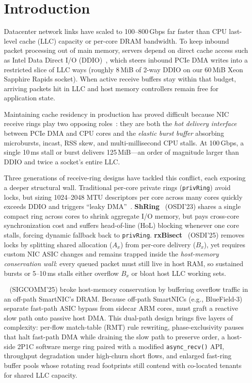 \section{Introduction}
\label{sec:intro}

Datacenter network links have scaled to 100--800\,Gbps far faster than CPU
last-level cache (LLC) capacity or per-core DRAM bandwidth. To keep inbound
packet processing out of main memory, servers depend on direct cache access
such as Intel Data Direct I/O (DDIO)~\cite{huggahalli2005dca,intelddio,farshin2020ddio},
which steers inbound PCIe DMA writes into a restricted slice of LLC ways
(roughly 8\,MiB of 2-way DDIO on our 60\,MiB Xeon Sapphire Rapids socket). When
active receive buffers stay within that budget, arriving packets hit in LLC and
host memory controllers remain free for application state.

Maintaining cache residency in production has proved difficult because NIC
receive rings play two opposing roles~\cite{pismenny2025rxbisect,liu2025ceio}:
they are both the \emph{hot delivery interface} between PCIe DMA and CPU cores
and the \emph{elastic burst buffer} absorbing microbursts, incast, RSS skew,
and multi-millisecond CPU stalls. At 100\,Gbps, a single 10\,ms stall or burst
delivers 125\,MiB---an order of magnitude larger than DDIO and twice a socket's
entire LLC.

Three generations of receive-ring designs have tackled this conflict, each
exposing a deeper structural wall. Traditional per-core private rings
(\texttt{privRing}) avoid locks, but sizing 1024--2048 MTU descriptors per core
across many cores quickly exceeds DDIO and triggers ``leaky
DMA''~\cite{tootoonchian2018resq,farshin2020ddio,yuan2021ioalloc}.
\textbf{ShRing}~\cite{pismenny2023shring} (OSDI'23) shares a single compact
ring across cores to shrink aggregate I/O memory, but pays cross-core
synchronization cost and suffers head-of-line (HoL) blocking whenever one core
stalls, forcing dynamic fallback back to \texttt{privRing}.
\textbf{rxBisect}~\cite{pismenny2025rxbisect} (OSDI'25) removes locks by
splitting shared allocation ($A_x$) from per-core delivery ($B_x$), yet
requires custom NIC ASIC changes and remains trapped inside the
\emph{host-memory conservation wall}: every queued packet must still live in
host RAM, so sustained bursts or 5--10\,ms stalls either overflow $B_x$ or
bloat host LLC working sets.

\textbf{\ceio{}}~\cite{liu2025ceio} (SIGCOMM'25) broke host-memory conservation
by buffering overflow traffic in an off-path SmartNIC's DRAM. Because off-path
SmartNICs (e.g., BlueField-3) separate fast-path ASIC bypass from sidecar ARM
cores, \ceio{} must graft a reactive slow path onto passive host DMA. This
dual-path design brings five layers of complexity: per-flow match-table (RMT)
rule rewriting, phase-exclusivity pauses that halt fast-path DMA while draining
the slow path to preserve order, a host-side 2P1C software merge ring paired
with a modified \texttt{async\_recv()} API, throughput degradation under
high-churn short flows, and enlarged fast-ring buffer pools whose rotating read
footprints still contend with co-located tenants for shared LLC capacity.

